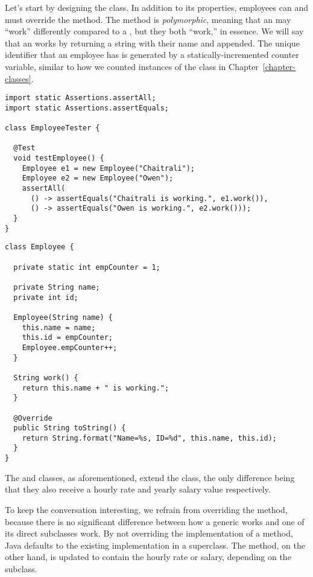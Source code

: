 Let's start by designing the  class. 
In addition to its properties, employees can  and must override the  method. 
The  method is \emph{polymorphic}, meaning that an  may ``work'' differently compared to a , but they both ``work,'' in essence. 
We will say that an  works by returning a string with their name and  appended. 
The unique identifier that an employee has is generated by a statically-incremented counter variable, similar to how we counted instances of the  class in Chapter~\ref{chapter-classes}.

\begin{lstlisting}[language=MyJava]
import static Assertions.assertAll;
import static Assertions.assertEquals;

class EmployeeTester {

  @Test
  void testEmployee() {
    Employee e1 = new Employee("Chaitrali");
    Employee e2 = new Employee("Owen");
    assertAll(
      () -> assertEquals("Chaitrali is working.", e1.work()),
      () -> assertEquals("Owen is working.", e2.work()));
  }
}
\end{lstlisting}

\begin{lstlisting}[language=MyJava]
class Employee {

  private static int empCounter = 1;

  private String name;
  private int id;

  Employee(String name) {
    this.name = name;
    this.id = empCounter;
    Employee.empCounter++;
  }

  String work() {
    return this.name + " is working.";
  }

  @Override
  public String toString() {
    return String.format("Name=%s, ID=%d", this.name, this.id);
  } 
}
\end{lstlisting}

The  and  classes, as aforementioned, extend the  class, the only difference being that they also receive a hourly rate and yearly salary value respectively. 

To keep the conversation interesting, we refrain from overriding the  method, because there is no significant difference between how a generic  works and one of its direct subclasses work. 
By not overriding the implementation of a method, Java defaults to the existing implementation in a superclass. 
The  method, on the other hand, is updated to contain the hourly rate or salary, depending on the subclass.

